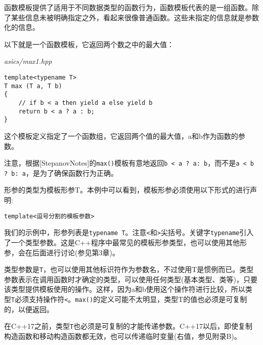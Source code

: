 

函数模板提供了适用于不同数据类型的函数行为，函数模板代表的是一组函数。除了某些信息未被明确指定之外，看起来很像普通函数。这些未指定的信息就是参数化的信息。


以下就是一个函数模板，它返回两个数之中的最大值：

\noindent
\textit{asics/max1.hpp}
\begin{lstlisting}[style=styleCXX]
template<typename T>
T max (T a, T b)
{
	// if b < a then yield a else yield b
	return b < a ? a : b;
}
\end{lstlisting}

这个模板定义指定了一个函数组，它返回两个值的最大值，a和b作为函数的参数。

\begin{tcolorbox}[colback=webgreen!5!white,colframe=webgreen!75!black]
\hspace*{0.75cm}注意，根据[StepanovNotes]的\texttt{max()}模板有意地返回\texttt{b < a ? a: b}，而不是\texttt{a < b ? b: a}，是为了确保函数行为正确。
\end{tcolorbox}

形参的类型为模板形参T。本例中可以看到，模板形参必须使用以下形式的进行声明:

\begin{lstlisting}[style=styleCXX]
template<逗号分割的模板参数>
\end{lstlisting}

我们的示例中，形参列表是\texttt{typename T}。注意\texttt{<}和\texttt{>}尖括号。关键字\texttt{typename}引入了一个类型参数。这是C++程序中最常见的模板形参类型，也可以使用其他形参，会在后面进行讨论(参见第3章)。

类型参数是\texttt{T}，也可以使用其他标识符作为参数名，不过使用T是惯例而已。类型参数表示在调用函数时才确定的类型，可以使用任何类型(基本类型、类等)，只要该类型提供模板使用的操作。这样，因为a和b使用这个操作符进行比较，所以类型\texttt{T}必须支持操作符\texttt{<}。\texttt{max()}的定义可能不太明显，类型T的值也必须是可复制的，以便返回。

\begin{tcolorbox}[colback=webgreen!5!white,colframe=webgreen!75!black]
\hspace*{0.75cm}在C++17之前，类型\texttt{T}也必须是可复制的才能传递参数。C++17以后，即使复制构造函数和移动构造函数都无效，也可以传递临时变量(右值，参见附录B)。
\end{tcolorbox}

